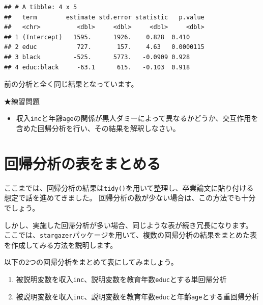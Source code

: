 \documentclass[]{book}
\newenvironment{Shaded}{\begin{snugshade}}{\end{snugshade}}
\newcommand{\KeywordTok}[1]{\textcolor[rgb]{0.13,0.29,0.53}{\textbf{#1}}}
\newcommand{\DataTypeTok}[1]{\textcolor[rgb]{0.13,0.29,0.53}{#1}}
\newcommand{\StringTok}[1]{\textcolor[rgb]{0.31,0.60,0.02}{#1}}
\newcommand{\OperatorTok}[1]{\textcolor[rgb]{0.81,0.36,0.00}{\textbf{#1}}}
\newcommand{\NormalTok}[1]{#1}
\providecommand{\tightlist}{%
  \setlength{\itemsep}{0pt}\setlength{\parskip}{0pt}}
\begin{document}
\begin{Shaded}
\end{Shaded}

\begin{verbatim}
## # A tibble: 4 x 5
##   term        estimate std.error statistic   p.value
##   <chr>          <dbl>     <dbl>     <dbl>     <dbl>
## 1 (Intercept)   1595.      1926.    0.828  0.410    
## 2 educ           727.       157.    4.63   0.0000115
## 3 black         -525.      5773.   -0.0909 0.928    
## 4 educ:black     -63.1      615.   -0.103  0.918
\end{verbatim}

前の分析と全く同じ結果となっています。

★練習問題

\begin{itemize}
\tightlist
\item
  収入\texttt{inc}と年齢\texttt{age}の関係が黒人ダミーによって異なるかどうか、交互作用を含めた回帰分析を行い、その結果を解釈しなさい。
\end{itemize}

\section{回帰分析の表をまとめる}\label{ux56deux5e30ux5206ux6790ux306eux8868ux3092ux307eux3068ux3081ux308b}

ここまでは、回帰分析の結果は\texttt{tidy()}を用いて整理し、卒業論文に貼り付ける想定で話を進めてきました。
回帰分析の数が少ない場合は、この方法でも十分でしょう。

しかし、実施した回帰分析が多い場合、同じような表が続き冗長になります。
ここでは、\texttt{stargazer}パッケージを用いて、複数の回帰分析の結果をまとめた表を作成してみる方法を説明します。

以下の2つの回帰分析をまとめて表にしてみましょう。

\begin{enumerate}
\def\labelenumi{\arabic{enumi}.}
\tightlist
\item
  被説明変数を収入\texttt{inc}、説明変数を教育年数\texttt{educ}とする単回帰分析
\item
  被説明変数を収入\texttt{inc}、説明変数を教育年数\texttt{educ}と年齢\texttt{age}とする重回帰分析
\end{enumerate}
\end{document}
